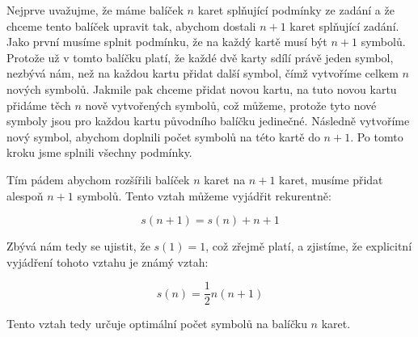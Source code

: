 \documentclass{fkssolpub}
\author{Ondřej Sedláček}
\begin{document}
 

Nejprve uvažujme, že máme balíček $n$ karet splňující podmínky ze
zadání a že chceme tento balíček upravit tak, abychom dostali $n + 1$
karet splňující zadání. Jako první musíme splnit podmínku, že na každý
kartě musí být $n + 1$ symbolů. Protože už v tomto balíčku platí, že každé
dvě karty sdílí právě jeden symbol, nezbývá nám, než na každou kartu
přidat další symbol, čímž vytvoříme celkem $n$ nových symbolů. Jakmile
pak chceme přidat novou kartu, na tuto novou kartu přidáme těch $n$ nově
vytvořených symbolů, což můžeme, protože tyto nové symboly jsou pro každou kartu
původního balíčku jedinečné. Následně vytvoříme nový symbol, abychom 
doplnili počet symbolů na této kartě do $n + 1$. Po tomto kroku
jsme splnili všechny podmínky.

Tím pádem abychom rozšířili
balíček $n$ karet na $n + 1$ karet, musíme přidat alespoň $n + 1$ symbolů.
Tento vztah můžeme vyjádřit rekurentně:

\[
  s(n + 1) = s(n) + n + 1
\]

Zbývá nám tedy se ujistit, že $s(1) = 1$, což zřejmě platí, a zjistíme,
že explicitní vyjádření tohoto vztahu je známý vztah:

\[
  s(n) = \frac{1}{2} n (n + 1)
\]

Tento vztah tedy určuje optimální počet symbolů na balíčku $n$ karet.
\end{document}
